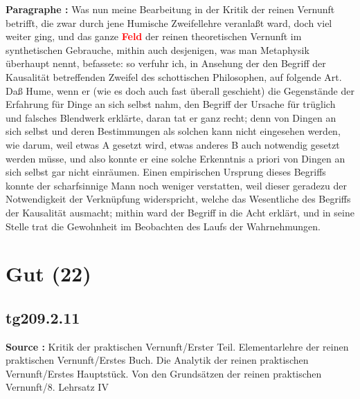 \documentclass[a4paper,12pt,twoside]{book}
\newcommand{\match}[1]{\textcolor{red}{\textbf{#1}}}
\newcommand{\unnumberedsection}[1]{
	\section*{#1}
	\addcontentsline{toc}{section}{#1}
	\markright{#1}
}
\begin{document}
	\noindent\textbf{Paragraphe : }Was nun meine Bearbeitung in der Kritik der reinen Vernunft betrifft, die zwar durch jene Humische Zweifellehre veranlaßt ward, doch viel weiter ging, und das ganze \match{Feld} der reinen theoretischen Vernunft im synthetischen Gebrauche, mithin auch desjenigen, was man Metaphysik überhaupt nennt, befassete: so verfuhr ich, in Ansehung der den Begriff der Kausalität betreffenden Zweifel des schottischen Philosophen, auf folgende Art. Daß Hume, wenn er (wie es doch auch fast überall geschieht) die Gegenstände der Erfahrung für Dinge an sich selbst nahm, den Begriff der Ursache für trüglich und falsches Blendwerk erklärte, daran tat er ganz recht; denn von Dingen an sich selbst und deren Bestimmungen als solchen kann nicht eingesehen werden, wie darum, weil etwas A gesetzt wird, etwas anderes B auch notwendig gesetzt werden müsse, und also konnte er eine solche Erkenntnis a priori von Dingen an sich selbst gar nicht einräumen. Einen empirischen Ursprung dieses Begriffs konnte der scharfsinnige Mann noch weniger verstatten, weil dieser geradezu der Notwendigkeit der Verknüpfung widerspricht, welche das Wesentliche des Begriffs der Kausalität ausmacht; mithin ward der Begriff in die Acht erklärt, und in seine Stelle  trat die Gewohnheit im Beobachten des Laufs der Wahrnehmungen. 
	
	\unnumberedsection{Gut (22)} 
	\subsection*{tg209.2.11} 
	\textbf{Source : }Kritik der praktischen Vernunft/Erster Teil. Elementarlehre der reinen praktischen Vernunft/Erstes Buch. Die Analytik der reinen praktischen Vernunft/Erstes Hauptstück. Von den Grundsätzen der reinen praktischen Vernunft/8. Lehrsatz IV\\  
	
\end{document}
